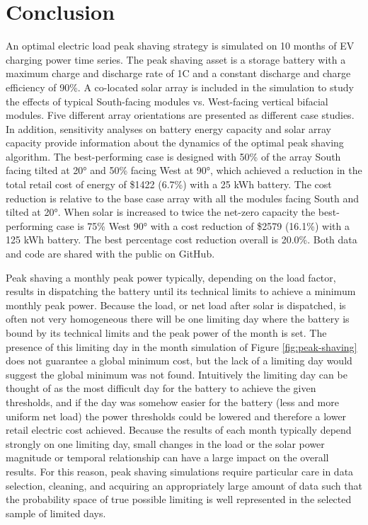 \documentclass[journal,article,submit,pdftex,moreauthors]{Definitions/mdpi}
\begin{document}
\section{Conclusion}\label{conclusion}%

An optimal electric load peak shaving strategy is simulated on 10 months of EV charging power time series. The peak shaving asset is a storage battery with a maximum charge and discharge rate of 1C and a constant discharge and charge efficiency of 90\%. A co-located solar array is included in the simulation to study the effects of typical South-facing modules vs. West-facing vertical bifacial modules. Five different array orientations are presented as different case studies. In addition, sensitivity analyses on battery energy capacity and solar array capacity provide information about the dynamics of the optimal peak shaving algorithm. The best-performing case is designed with 50\% of the array South facing tilted at 20° and 50\% facing West at 90°, which achieved a reduction in the total retail cost of energy of \$1422 (6.7\%) with a 25 kWh battery. The cost reduction is relative to the base case array with all the modules facing South and tilted at 20°. When solar is increased to twice the net-zero capacity the best-performing case is 75\% West 90° with a cost reduction of \$2579 (16.1\%) with a 125 kWh battery. The best percentage cost reduction overall is 20.0\%. Both data and code are shared with the public on GitHub.

Peak shaving a monthly peak power typically, depending on the load factor, results in dispatching the battery until its technical limits to achieve a minimum monthly peak power. Because the load, or net load after solar is dispatched, is often not very homogeneous there will be one limiting day where the battery is bound by its technical limits and the peak power of the month is set. The presence of this limiting day in the month simulation of Figure \ref{fig:peak-shaving} does not guarantee a global minimum cost, but the lack of a limiting day would suggest the global minimum was not found. Intuitively the limiting day can be thought of as the most difficult day for the battery to achieve the given thresholds, and if the day was somehow easier for the battery (less and more uniform net load) the power thresholds could be lowered and therefore a lower retail electric cost achieved. Because the results of each month typically depend strongly on one limiting day, small changes in the load or the solar power magnitude or temporal relationship can have a large impact on the overall results. For this reason, peak shaving simulations require particular care in data selection, cleaning, and acquiring an appropriately large amount of data such that the probability space of true possible limiting is well represented in the selected sample of limited days.
\end{document}
